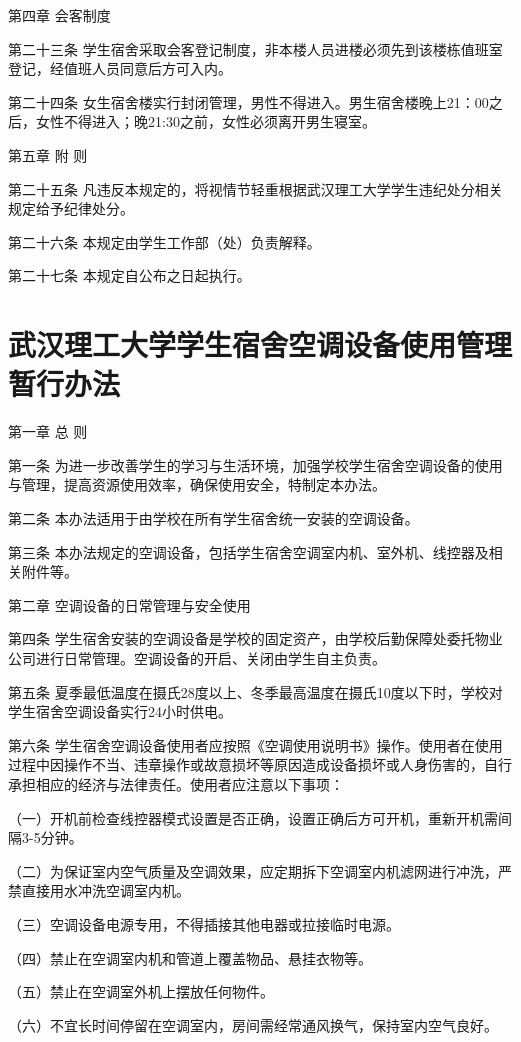 \documentclass[UTF8,12pt,a4paper]{report}
\begin{document}
第四章 会客制度

第二十三条 学生宿舍采取会客登记制度，非本楼人员进楼必须先到该楼栋值班室登记，经值班人员同意后方可入内。

第二十四条 女生宿舍楼实行封闭管理，男性不得进入。男生宿舍楼晚上21：00之后，女性不得进入；晚21:30之前，女性必须离开男生寝室。

第五章 附 则

第二十五条 凡违反本规定的，将视情节轻重根据武汉理工大学学生违纪处分相关规定给予纪律处分。

第二十六条 本规定由学生工作部（处）负责解释。

第二十七条 本规定自公布之日起执行。

\chapter{武汉理工大学学生宿舍空调设备使用管理暂行办法}
第一章 总 则

第一条 为进一步改善学生的学习与生活环境，加强学校学生宿舍空调设备的使用与管理，提高资源使用效率，确保使用安全，特制定本办法。

第二条 本办法适用于由学校在所有学生宿舍统一安装的空调设备。

第三条 本办法规定的空调设备，包括学生宿舍空调室内机、室外机、线控器及相关附件等。

第二章 空调设备的日常管理与安全使用

第四条 学生宿舍安装的空调设备是学校的固定资产，由学校后勤保障处委托物业公司进行日常管理。空调设备的开启、关闭由学生自主负责。

第五条 夏季最低温度在摄氏28度以上、冬季最高温度在摄氏10度以下时，学校对学生宿舍空调设备实行24小时供电。

第六条 学生宿舍空调设备使用者应按照《空调使用说明书》操作。使用者在使用过程中因操作不当、违章操作或故意损坏等原因造成设备损坏或人身伤害的，自行承担相应的经济与法律责任。使用者应注意以下事项：

（一）开机前检查线控器模式设置是否正确，设置正确后方可开机，重新开机需间隔3-5分钟。

（二）为保证室内空气质量及空调效果，应定期拆下空调室内机滤网进行冲洗，严禁直接用水冲洗空调室内机。

（三）空调设备电源专用，不得插接其他电器或拉接临时电源。

（四）禁止在空调室内机和管道上覆盖物品、悬挂衣物等。

（五）禁止在空调室外机上摆放任何物件。

（六）不宜长时间停留在空调室内，房间需经常通风换气，保持室内空气良好。
\end{document}
